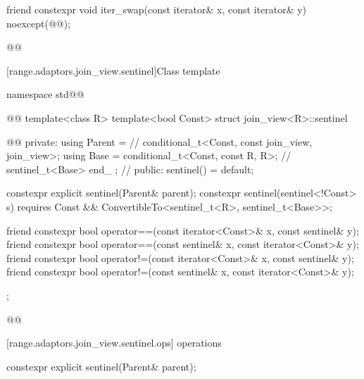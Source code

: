 \begin{itemdecl}
friend constexpr void iter_swap(const iterator& x, const iterator& y)
  noexcept(@\oldtxt{\seebelow}@);
\end{itemdecl}

\begin{itemdescr}
\pnum
\oldtxt{\returns} 

\pnum
{}
\begin{codeblock}
@@
\end{codeblock}
\end{itemdescr}

[range.adaptors.join_view.sentinel]{Class template }

\pnum
{}

\begin{codeblock}
namespace std@@ { @@
  template<class R>
  template<bool Const>
  struct join_view<R>::sentinel { @\newtxt{// \expos}@
  private:
    using Parent =                                   // \expos
      conditional_t<Const, const join_view, join_view>;
    using Base   = conditional_t<Const, const R, R>; // \expos
    sentinel_t<Base> end_ {};                        // \expos
  public:
    sentinel() = default;

    constexpr explicit sentinel(Parent& parent);
    constexpr sentinel(sentinel<!Const> s) requires Const &&
        ConvertibleTo<sentinel_t<R>, sentinel_t<Base>>;

    friend constexpr bool operator==(const iterator<Const>& x, const sentinel& y);
    friend constexpr bool operator==(const sentinel& x, const iterator<Const>& y);
    friend constexpr bool operator!=(const iterator<Const>& x, const sentinel& y);
    friend constexpr bool operator!=(const sentinel& x, const iterator<Const>& y);
  };
}@\oldtxt{\}}@
\end{codeblock}

[range.adaptors.join_view.sentinel.ops]{ operations}

\begin{itemdecl}
constexpr explicit sentinel(Parent& parent);
\end{itemdecl}

